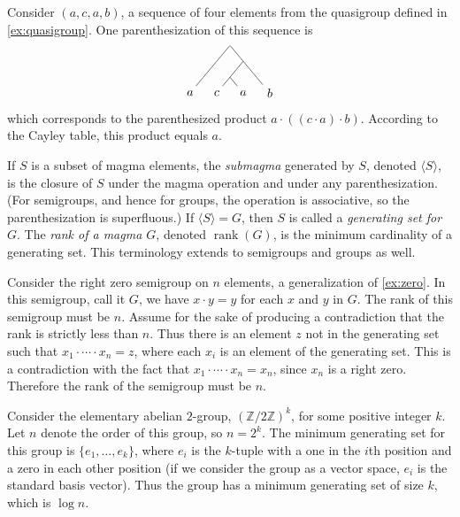 \documentclass{article}
\newcommand{\gen}[1]{\langle #1 \rangle}
\DeclareMathOperator{\rank}{rank}
\begin{document}
\begin{example}
  Consider $(a, c, a, b)$, a sequence of four elements from the quasigroup defined in \autoref{ex:quasigroup}.
  One parenthesization of this sequence is
  \begin{equation*}
    \begin{tikzpicture}[xscale=0.5, yscale=0.3]
      \node[minimum size=0pt, inner sep=0pt] {}
      child {
        child {
          child {node {$a$}}
          child[color=white] {}
        }
        child[color=white] {}
      }
      child {
        child {
          child {node {$c$}}
          child {node {$a$}}
        }
        child {
          child[color=white] {}
          child {node {$b$}}
        }
      };
    \end{tikzpicture}
  \end{equation*}
  which corresponds to the parenthesized product $a \cdot ((c \cdot a) \cdot b)$.
  According to the Cayley table, this product equals $a$.
\end{example}

If $S$ is a subset of magma elements, the \emph{submagma} generated by $S$, denoted $\gen{S}$, is the closure of $S$ under the magma operation and under any parenthesization.
(For semigroups, and hence for groups, the operation is associative, so the parenthesization is superfluous.)
If $\gen{S} = G$, then $S$ is called a \emph{generating set for $G$}.
The \emph{rank of a magma $G$}, denoted $\rank(G)$, is the minimum cardinality of a generating set.
This terminology extends to semigroups and groups as well.

\begin{example}\label{ex:semigroupgen}
  Consider the right zero semigroup on $n$ elements, a generalization of \autoref{ex:zero}.
  In this semigroup, call it $G$, we have $x \cdot y = y$ for each $x$ and $y$ in $G$.
  The rank of this semigroup must be $n$.
  Assume for the sake of producing a contradiction that the rank is strictly less than $n$.
  Thus there is an element $z$ not in the generating set such that $x_1 \cdot \dotsb \cdot x_n = z$, where each $x_i$ is an element of the generating set.
  This is a contradiction with the fact that $x_1 \cdot \dotsb \cdot x_n = x_n$, since $x_n$ is a right zero.
  Therefore the rank of the semigroup must be $n$.
\end{example}

\begin{example}\label{ex:elementary}
  Consider the elementary abelian $2$-group, $(\mathbb{Z} / 2 \mathbb{Z})^k$, for some positive integer $k$.
  Let $n$ denote the order of this group, so $n = 2^k$.
  The minimum generating set for this group is $\{e_1, \dotsc, e_k\}$, where $e_i$ is the $k$-tuple with a one in the $i$th position and a zero in each other position (if we consider the group as a vector space, $e_i$ is the standard basis vector).
  Thus the group has a minimum generating set of size $k$, which is $\log n$.
\end{example}
\end{document}
